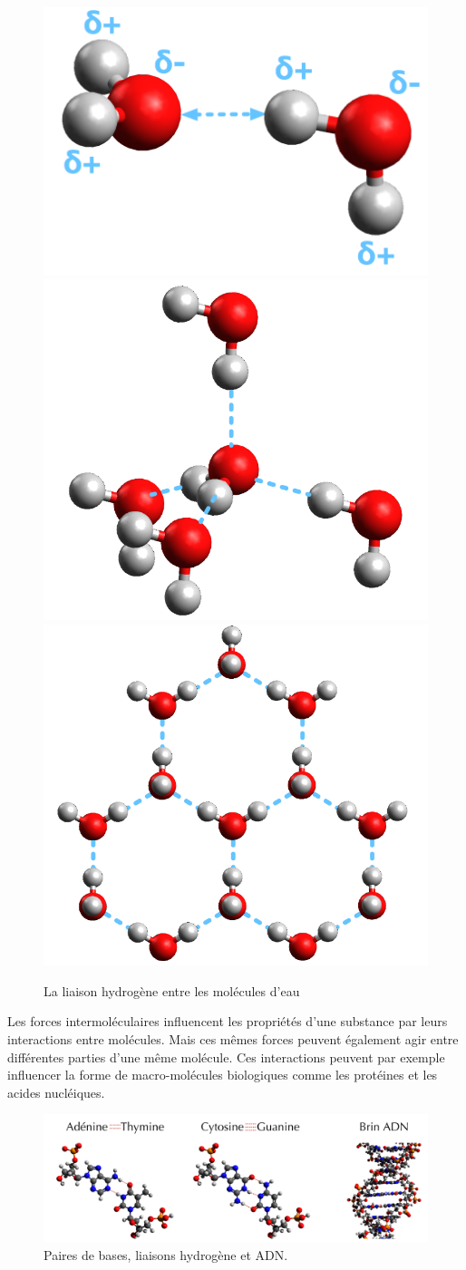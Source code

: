\documentclass[
  11pt,
  a4paper,
  openany]{book}
\begin{document}
\begin{figure}

{\centering \includegraphics[width=0.25\linewidth]{images/ice-0} \includegraphics[width=0.25\linewidth]{images/ice-tetra} \includegraphics[width=0.25\linewidth]{images/ice} 

}

\caption{La liaison hydrogène entre les molécules d'eau}\label{fig:eau-liaison-hydrogene}
\end{figure}

Les forces intermoléculaires influencent les propriétés d'une substance par leurs interactions entre molécules. Mais ces mêmes forces peuvent également agir entre différentes parties d'une même molécule. Ces interactions peuvent par exemple influencer la forme de macro-molécules biologiques comme les protéines et les acides nucléiques.

\begin{figure}

{\centering \includegraphics[width=1\linewidth]{images/dna} 

}

\caption{Paires de bases, liaisons hydrogène et ADN.}\label{fig:dna}
\end{figure}
\end{document}
